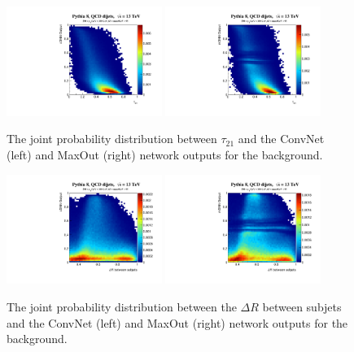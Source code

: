 \documentclass{article}
\begin{document}
\begin{figure}[htbp!]
  \begin{center}
        \includegraphics[width=0.45\textwidth]{figures/tau21_convnet_back.pdf} \includegraphics[width=0.45\textwidth]{figures/tau21_maxout_back.pdf}
      \caption{ The joint probability distribution between $\tau_{21}$ and the ConvNet (left) and MaxOut (right) network outputs for the background. 
      \label{fig:tau21_DNN} }
    \end{center}
\end{figure}

\begin{figure}[htbp!]
  \begin{center}
        \includegraphics[width=0.45\textwidth]{figures/dR_convnet_back.pdf} \includegraphics[width=0.45\textwidth]{figures/dR_maxout_back.pdf}
      \caption{ The joint probability distribution between the $\Delta R$ between subjets and the ConvNet (left) and MaxOut (right) network outputs for the background. 
      \label{fig:dr_DNN} }
    \end{center}
\end{figure}
\end{document}

